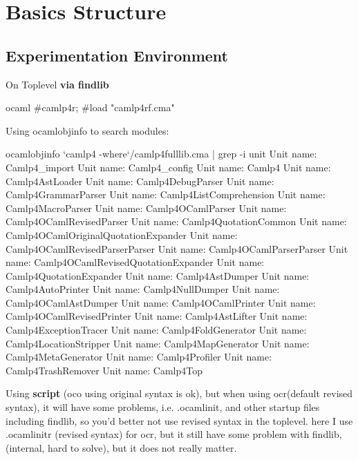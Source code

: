 \section{Basics Structure}

\subsection{Experimentation Environment}

On Toplevel {\bf via findlib}
\begin{ocamlcode}
ocaml
#camlp4r;
#load "camlp4rf.cma"
\end{ocamlcode}

Using ocamlobjinfo to search modules:     
\begin{bluetext}
ocamlobjinfo `camlp4 -where`/camlp4fulllib.cma | grep -i unit
Unit name: Camlp4_import
Unit name: Camlp4_config
Unit name: Camlp4
Unit name: Camlp4AstLoader
Unit name: Camlp4DebugParser
Unit name: Camlp4GrammarParser
Unit name: Camlp4ListComprehension
Unit name: Camlp4MacroParser
Unit name: Camlp4OCamlParser
Unit name: Camlp4OCamlRevisedParser
Unit name: Camlp4QuotationCommon
Unit name: Camlp4OCamlOriginalQuotationExpander
Unit name: Camlp4OCamlRevisedParserParser
Unit name: Camlp4OCamlParserParser
Unit name: Camlp4OCamlRevisedQuotationExpander
Unit name: Camlp4QuotationExpander
Unit name: Camlp4AstDumper
Unit name: Camlp4AutoPrinter
Unit name: Camlp4NullDumper
Unit name: Camlp4OCamlAstDumper
Unit name: Camlp4OCamlPrinter
Unit name: Camlp4OCamlRevisedPrinter
Unit name: Camlp4AstLifter
Unit name: Camlp4ExceptionTracer
Unit name: Camlp4FoldGenerator
Unit name: Camlp4LocationStripper
Unit name: Camlp4MapGenerator
Unit name: Camlp4MetaGenerator
Unit name: Camlp4Profiler
Unit name: Camlp4TrashRemover
Unit name: Camlp4Top
\end{bluetext}


Using \textbf{script} (oco using original syntax is ok), but when
using ocr(default revised syntax), it will have some problems,
i.e. .ocamlinit, and other startup files including findlib, so you'd
better not use revised syntax in the toplevel. here I use
.ocamlinitr (revised syntax) for ocr, but it still have some problem
with findlib, (internal, hard to solve), but it does not really matter.




